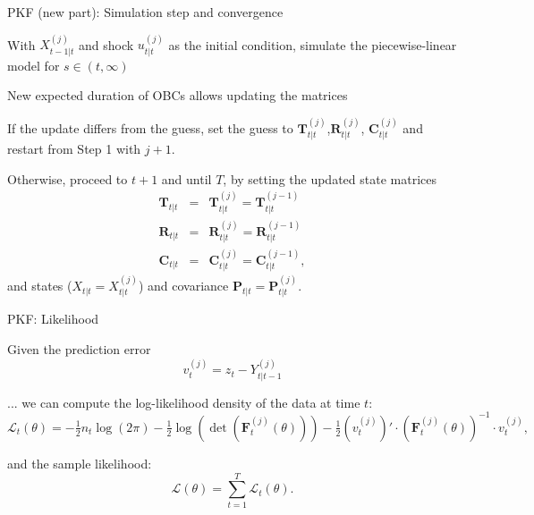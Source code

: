 \begin{frame}{PKF (new part): Simulation step and convergence}
\begin{wideitemize}
\item With $X^{(j)}_{t-1|t}$ and shock $u^{(j)}_{t|t}$ as the initial condition, simulate the piecewise-linear model for $s\in (t, \infty)$
    \item New expected duration of OBCs allows updating the matrices%
\item If the update differs from the guess, set the guess to $\mathbf{T}^{(j)}_{t|t}$,$\mathbf{R}^{(j)}_{t|t}$, $\mathbf{C}^{(j)}_{t|t}$ and restart from Step 1 with $j+1$.
\item Otherwise, proceed to $t+1$ and until $T$, by setting the updated state matrices
	\begin{eqnarray*}
		\mathbf{T}_{t|t}&=&\mathbf{T}^{(j)}_{t|t} =\mathbf{T}^{(j-1)}_{t|t} \\
		\mathbf{R}_{t|t}&=&\mathbf{R}^{(j)}_{t|t}=\mathbf{R}^{(j-1)}_{t|t} \\
		\mathbf{C}_{t|t}&=&\mathbf{C}^{(j)}_{t|t}=\mathbf{C}^{(j-1)}_{t|t}  ,
	\end{eqnarray*}
and states ($X_{t|t}=X^{(j)}_{t|t}$) and covariance $\mathbf{P}_{t|t}=\mathbf{P}^{(j)}_{t|t}$.
\end{wideitemize}
\end{frame}

\begin{frame}{PKF: Likelihood}
\begin{wideitemize}
\item Given the prediction error 
\begin{equation*}\label{eq:errorPKF}
v_{t}^{(j)}= z_t-Y^{(j)}_{t|t-1}
\end{equation*}
\item ... we can compute the log-likelihood density of the data at time $t$:
\begin{equation*}\label{eq:likt}
\mathcal{L}_t(\theta)=-\tfrac{1}{2} n_t \log\left(2\pi\right) -\tfrac{1}{2}\log\left(\det(\mathbf{F}^{(j)}_{t}(\theta))\right) -\tfrac{1}{2} \left(v^{(j)}_t\right)'\cdot \left(\mathbf{F}^{(j)}_{t}(\theta)\right)^{-1} \cdot v^{(j)}_t,
 \end{equation*}
\item and the sample likelihood:
\begin{equation*}\label{eq:likt}
\mathcal{L}(\theta) = \sum_{t = 1}^{T} \mathcal{L}_t(\theta).
\end{equation*}
\end{wideitemize}
\end{frame}


